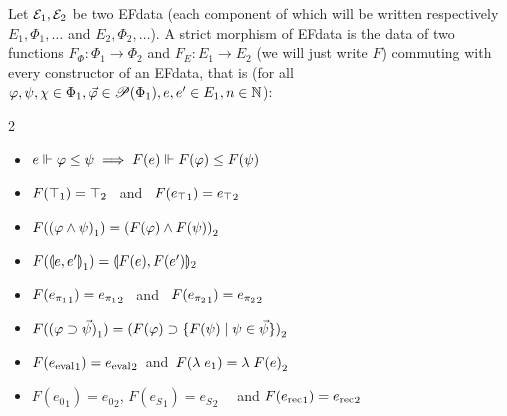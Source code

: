 \documentclass[a4paper,UKenglish,cleveref, autoref, thm-restate]{lipics-v2021}
\newcommand{\todo}[1]{\textcolor{red}{TODO: #1}}
\begin{document}
%

\begin{definition}
Let $\mathcal{E}_1,\mathcal{E}_2$ be two EFdata (each component of which will be written respectively $E_1,\Phi_1,\ldots$ and $E_2,\Phi_2,\ldots$).
A strict morphism of EFdata is the data of two functions $F_{\Phi} : \Phi_1 \to \Phi_2$ and $F_E : E_1 \to E_2$ (we will just write $F$) commuting with every constructor of an EFdata, that is (for all $\varphi,\psi,\chi\in\Phi_1,\vec\varphi\in\mathscr{P}(\Phi_1),e,e'\in E_1,n\in\mathbb N$):
\begin{multicols}{2}
  \begin{itemize}
  \item $e \Vdash \varphi \leq \psi \implies F(e) \Vdash F(\varphi) \leq F(\psi)$
  \item $F(\top_1) = \top_2$ ~and~ $F({e_\top}_1) = {e_\top}_2$
  \item $F({(\varphi \land \psi)}_1) = {(F(\varphi) \land F(\psi))}_2$
  \item $F({\llparenthesis e,e'\rrparenthesis}_1) = \llparenthesis F(e),F(e')\rrparenthesis_2$
  \item $F({e_{\pi_1}}_1) = {e_{\pi_1}}_2$ ~and~ $F({e_{\pi_2}}_1) = {e_{\pi_2}}_2$
  \item $F({(\varphi \supset \vec\psi)}_1) = {(F(\varphi) \supset \{F(\psi)\mid \psi \in \vec \psi\})}_2$
  \item $F({e_{\mathrm{eval}}}_1) = {e_{\mathrm{eval}}}_2$ \,and\, $F({\lambda\;e}_1) = {\lambda\;F(e)}_2$
  \item $F({e_{0}}_1) = {e_{0}}_2$, $F({e_{S}}_1) = {e_S}_2$ ~~and $F({e_{\mathrm{rec}}}_1) = {e_{\mathrm{rec}}}_2$

\end{itemize}
\end{multicols}
\end{definition}
\end{document}
